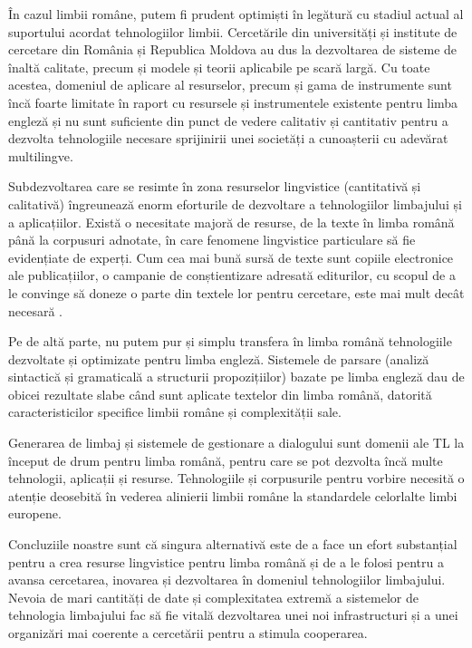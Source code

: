 \begin{multicols}{2}
În cazul limbii române, putem fi prudent optimiști în legătură cu stadiul actual al suportului acordat tehnologiilor limbii. Cercetările din universități și institute de cercetare din România și Republica Moldova au dus la dezvoltarea de sisteme de înaltă calitate, precum și modele și teorii aplicabile pe scară largă. Cu toate acestea, domeniul de aplicare al resurselor, precum și gama de instrumente sunt încă foarte limitate în raport cu resursele și instrumentele existente pentru limba engleză și nu sunt suficiente din punct de vedere calitativ și cantitativ pentru a dezvolta tehnologiile necesare sprijinirii unei societăți a cunoașterii cu adevărat multilingve. 

Subdezvoltarea care se resimte în zona resurselor lingvistice (cantitativă și calitativă) îngreunează enorm eforturile de dezvoltare a tehnologiilor limbajului și a aplicațiilor. Există o necesitate majoră de resurse, de la texte în limba română până la corpusuri adnotate, în care fenomene lingvistice particulare să fie evidențiate de experți. Cum cea mai bună sursă de texte sunt copiile electronice ale publicațiilor, o campanie de conștientizare adresată editurilor, cu scopul de a le convinge să doneze o parte din textele lor pentru cercetare, este mai mult decât necesară \cite{cristea4}.

Pe de altă parte, nu putem pur și simplu transfera în limba română tehnologiile dezvoltate și optimizate pentru limba engleză. Sistemele de parsare (analiză sintactică și gramaticală a structurii propozițiilor) bazate pe limba engleză dau de obicei rezultate slabe când sunt aplicate textelor din limba română, datorită caracteristicilor specifice limbii române și complexității sale.

Generarea de limbaj și sistemele de gestionare a dialogului sunt domenii ale TL la început de drum pentru limba română, pentru care se pot dezvolta încă multe tehnologii, aplicații și resurse. Tehnologiile și corpusurile pentru vorbire necesită o atenție deosebită în vederea alinierii limbii române la standardele celorlalte limbi europene.

Concluziile noastre sunt că singura alternativă este de a face un efort substanțial pentru a crea resurse lingvistice pentru limba română și de a le folosi pentru a avansa cercetarea, inovarea și dezvoltarea în domeniul tehnologiilor limbajului. Nevoia de mari cantități de date și complexitatea extremă a sistemelor de tehnologia limbajului fac să fie vitală dezvoltarea unei noi infrastructuri și a unei organizări mai coerente a cercetării pentru a stimula cooperarea.


\end{multicols}

